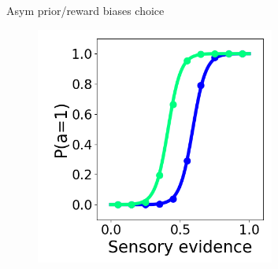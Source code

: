 \documentclass[14pt]{beamer}
\begin{document}
\begin{frame}{Asym prior/reward biases choice}

  \begin{figure}[htb]
  \includegraphics[width=0.7\textwidth]{images/ptask/avg_psycho}
  \end{figure}

\end{frame}
\end{document}
